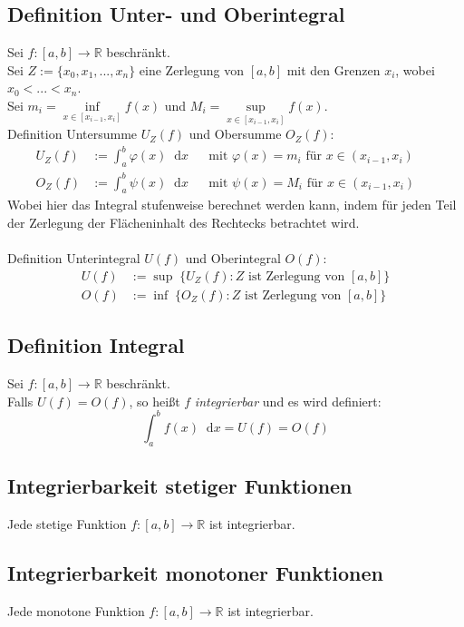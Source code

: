 \documentclass[halfparscip]{scrartcl}
\newcommand*\dif{\mathop{}\!\mathrm{d}}
\newcounter{subsection2}
\begin{document}
\subsection*{Definition Unter- und Oberintegral}
Sei $f: [a,b] \rightarrow \mathbb{R}$ beschränkt.\\
Sei $Z := \{x_0, x_1, ..., x_n\}$ eine Zerlegung von $[a,b]$ mit den Grenzen $x_i$, wobei $x_0 < ... < x_n$.\\
Sei $m_i = \inf\limits_{x \in [x_{i-1}, x_i]} f(x)$ und $M_i = \sup\limits_{x \in [x_{i-1}, x_i]} f(x)$.\\
Definition Untersumme $U_Z(f)$ und Obersumme $O_Z(f)$:
\begin{align*}
	U_Z(f) &:= \int_{a}^{b}\varphi(x) \dif x & &\text{mit } \varphi(x) = m_i \text{ für } x \in (x_{i-1}, x_i) & &\\
	O_Z(f) &:= \int_{a}^{b}\psi(x) \dif x & &\text{mit } \psi(x) = M_i \text{ für } x \in (x_{i-1}, x_i) & &
\end{align*}
Wobei hier das Integral stufenweise berechnet werden kann, indem für jeden Teil der Zerlegung der Flächeninhalt des Rechtecks betrachtet wird.\\\\ 
Definition Unterintegral $U(f)$ und Oberintegral $O(f)$:
\begin{align*}
	U(f) &:= \sup\; \{U_Z(f) : Z \text{ ist Zerlegung von } [a,b]\}\\
	O(f) &:= \inf\; \{O_Z(f) : Z \text{ ist Zerlegung von } [a,b]\}
\end{align*}

\subsection{Definition Integral}
Sei $f: [a,b] \rightarrow \mathbb{R}$ beschränkt. \\
Falls $U(f) = O(f)$, so heißt $f$ \textit{integrierbar} und es wird definiert:
\begin{equation*}
	\int_{a}^{b} f(x) \dif x = U(f) = O(f)
\end{equation*}

\subsection{Integrierbarkeit stetiger Funktionen}
Jede stetige Funktion $f: [a,b] \rightarrow \mathbb{R}$ ist integrierbar.

\subsection{Integrierbarkeit monotoner Funktionen}
Jede monotone Funktion $f: [a,b] \rightarrow \mathbb{R}$ ist integrierbar.
\end{document}

